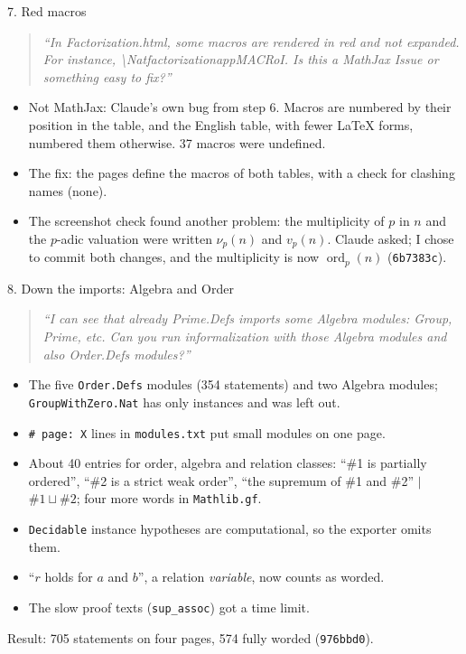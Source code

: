 \documentclass[10pt,aspectratio=169]{beamer}
\newcommand{\commit}[1]{\texttt{\footnotesize #1}}
\newcommand{\prompt}[1]{\begin{quote}\small\itshape ``#1''\end{quote}}
\begin{document}
\begin{frame}{7. Red macros}
  \prompt{In Factorization.html, some macros are rendered in red and not
  expanded. For instance, \textbackslash NatfactorizationappMACRoI. Is this a
  MathJax Issue or something easy to fix?}
  \begin{itemize}
    \item Not MathJax: Claude's own bug from step 6. Macros are numbered by
          their position in the table, and the English table, with fewer
          LaTeX forms, numbered them otherwise. 37 macros were undefined.
    \item The fix: the pages define the macros of both tables, with a check
          for clashing names (none).
    \item The screenshot check found another problem: the multiplicity of
          $p$ in $n$ and the $p$-adic valuation were written $\nu_p(n)$ and
          $v_p(n)$. Claude asked; I chose to commit both changes, and
          the multiplicity is now $\operatorname{ord}_p(n)$ (\commit{6b7383c}).
  \end{itemize}
\end{frame}

\begin{frame}{8. Down the imports: Algebra and Order}
  \small
  \prompt{I can see that already Prime.Defs imports some Algebra modules:
  Group, Prime, etc. Can you run informalization with those Algebra modules
  and also Order.Defs modules?}
  \begin{itemize}
    \item The five \texttt{Order.Defs} modules (354 statements) and two
          Algebra modules; \texttt{GroupWithZero.Nat} has only instances and
          was left out.
    \item \texttt{\# page: X} lines in \texttt{modules.txt} put small modules on
          one page.
    \item About 40 entries for order, algebra and relation classes: ``\#1 is
          partially ordered'', ``\#2 is a strict weak order'', ``the supremum of
          \#1 and \#2'' $|$ $\#1 \sqcup \#2$; four more words in \texttt{Mathlib.gf}.
    \item \texttt{Decidable} instance hypotheses are computational, so the
          exporter omits them.
    \item ``$r$ holds for $a$ and $b$'', a relation \emph{variable}, now counts as worded.
    \item The slow proof texts (\texttt{sup\_assoc}) got a time limit.
  \end{itemize}
  Result: 705 statements on four pages, 574 fully worded (\commit{976bbd0}).
\end{frame}
\end{document}
